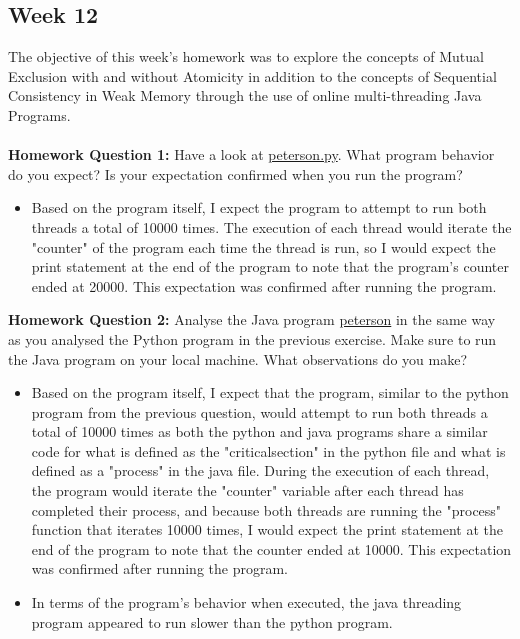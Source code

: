 \documentclass{article}
\theoremstyle{theorem}
\theoremstyle{definition}
\theoremstyle{remark}
\begin{document}
\subsection{Week 12} The objective of this week's homework was to explore the concepts of Mutual Exclusion with and without Atomicity in addition to the concepts of Sequential Consistency in Weak Memory through the use of online multi-threading Java Programs. \\ 
\\ \textbf{Homework Question 1:} Have a look at \href{https://colab.research.google.com/drive/126wdCs8F_VJ7VwTcaXUv70PwAVTGzVy_?usp=sharing}{peterson.py}. What program behavior do you expect? Is your expectation confirmed when you run the program?
\begin{itemize}
    \item Based on the program itself, I expect the program to attempt to run both threads a total of 10000 times. The execution of each thread would iterate the "counter" of the program each time the thread is run, so I would expect the print statement at the end of the program to note that the program's counter ended at 20000. This expectation was confirmed after running the program.
\end{itemize}
\textbf{Homework Question 2:} Analyse the Java program \href{https://www.online-java.com/G0N5eA9tR6}{peterson} in the same way as you analysed the Python program in the previous exercise. Make sure to run the Java program on your local machine. What observations do you make?
\begin{itemize}
    \item Based on the program itself, I expect that the program, similar to the python program from the previous question, would attempt to run both threads a total of 10000 times as both the python and java programs share a similar code for what is defined as the "critical\textunderscore section" in the python file and what is defined as a "process" in the java file. During the execution of each thread, the program would iterate the "counter" variable after each thread has completed their process, and because both threads are running the "process" function that iterates 10000 times, I would expect the print statement at the end of the program to note that the counter ended at 10000. This expectation was confirmed after running the program.
    \item In terms of the program's behavior when executed, the java threading program appeared to run slower than the python program.
\end{itemize} 
\end{document}
